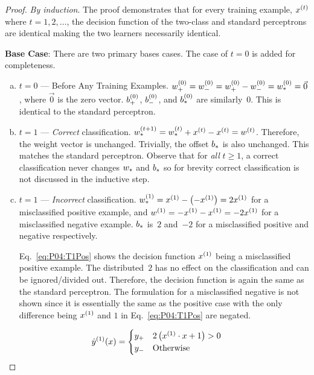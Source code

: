 \begin{proof}
  \textit{By induction}.  The proof demonstrates that for every training example, $x^{(t)}$ where $t=1,2,\ldots$, the decision function of the two-class and standard perceptrons are identical making the two learners necessarily identical.

  \noindent
\textbf{Base Case}:  There are two primary bases cases.  The case of $t=0$ is added for completeness.

\begin{enumerate}[(a)]
  \item $t=0$ --- Before Any Training Examples.  $w^{(0)}_{+}=w^{(0)}_{-}=w^{(0)}_{+}-w^{(0)}_{-}=w^{(0)}_{*}=\vec{0}$, where $\vec{0}$ is the zero vector.  $b^{(0)}_{+}$, $b^{(0)}_{-}$, and $b^{(0)}_{*}$ are similarly~$0$.  This is identical to the standard perceptron.

  \item $t=1$ --- \textit{Correct} classification.  $w^{(t+1)}_{*}=w^{(t)}_{*} + x^{(t)} - x^{(t)} = w^{(t)}$.  Therefore, the weight vector is unchanged.  Trivially, the offset $b_{*}$ is also unchanged.  This matches the standard perceptron.  Observe that for \textit{all} $t\geq1$, a correct classification never changes $w_{*}$ and $b_{*}$ so for brevity correct classification is not discussed in the inductive step.

  \item $t=1$ --- \textit{Incorrect} classification.  $w^{(1)}_{*} = x^{(1)} - \left(-x^{(1)}\right) = 2x^{(1)}$ for a misclassified positive example, and $w^{(1)}= -x^{(1)} - x^{(1)} = -2x^{(1)}$ for a misclassified negative example.  $b_{*}$ is~$2$ and~$-2$ for a misclassified positive and negative respectively.

    Eq.~\eqref{eq:P04:T1Pos} shows the decision function $x^{(1)}$ being a misclassified positive example. The distributed~$2$ has no effect on the classification and can be ignored/divided out.  Therefore, the decision function is again the same as the standard perceptron.  The formulation for a misclassified negative is not shown since it is essentially the same as the positive case with the only difference being $x^{(1)}$ and $1$ in Eq.~\eqref{eq:P04:T1Pos} are negated.
\end{enumerate}

\begin{equation}\label{eq:P04:T1Pos}
  \hat{y}^{(1)}(x) = \begin{cases}
                       y_{+} & 2\left(x^{(1)}\cdot x + 1\right) > 0 \\
                       y_{-} & \text{Otherwise}
                     \end{cases}
\end{equation}


\end{proof}
